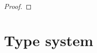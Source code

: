\documentclass[a4paper,11pt]{article}
\theoremstyle{definition}
\begin{document}
\begin{proof}




\end{proof}
\clearpage


\section{Type system}




% 



\end{document}

